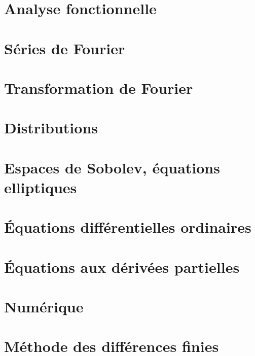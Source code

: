 \documentclass[french,a4paper]{book}
\begin{document}
\chapter{Analyse fonctionnelle}









\chapter{Séries de Fourier}


\chapter{Transformation de Fourier}


\chapter{Distributions}


\chapter{Espaces de Sobolev, équations elliptiques}      \label{CHAPooVTIIooGOEvXT}


\chapter{Équations différentielles ordinaires}





\chapter{Équations aux dérivées partielles}


\chapter{Numérique}





\chapter{Méthode des différences finies}



\end{document}
